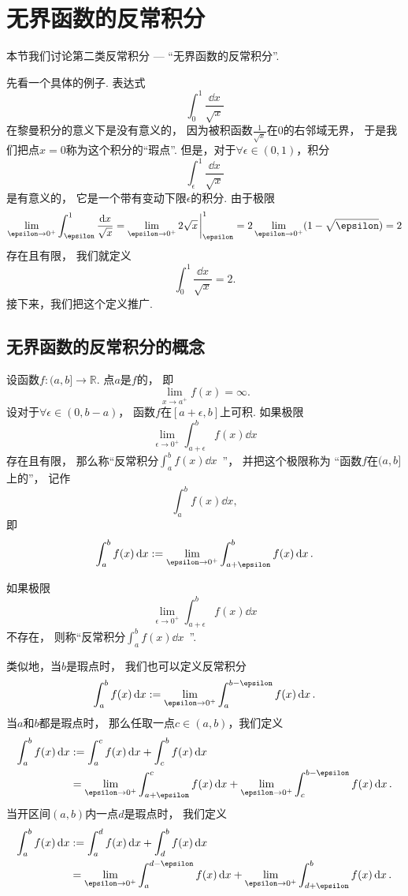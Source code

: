 \section{无界函数的反常积分}
本节我们讨论第二类反常积分 --- “无界函数的反常积分”.

先看一个具体的例子.
表达式\[
	\int_0^1 \frac{\dd{x}}{\sqrt{x}}
\]在黎曼积分的意义下是没有意义的，
因为被积函数\(\frac{1}{\sqrt{x}}\)在\(0\)的右邻域无界，
于是我们把点\(x=0\)称为这个积分的“瑕点”.
但是，对于\(\forall\epsilon\in(0,1)\)，积分\[
	\int_\epsilon^1 \frac{\dd{x}}{\sqrt{x}}
\]是有意义的，
它是一个带有变动下限\(\epsilon\)的积分.
由于极限\[
	\lim_{\epsilon\to0^+} \int_\epsilon^1 \frac{\dd{x}}{\sqrt{x}}
	= \lim_{\epsilon\to0^+} 2\sqrt{x}\eval_\epsilon^1
	= 2 \lim_{\epsilon\to0^+} (1-\sqrt\epsilon)
	= 2
\]存在且有限，
我们就定义\[
	\int_0^1 \frac{\dd{x}}{\sqrt{x}}=2.
\]
接下来，我们把这个定义推广.

\subsection{无界函数的反常积分的概念}
\begin{definition}\label{definition:定积分.无界函数的反常积分的定义1}
设函数\(f\colon(a,b]\to\mathbb{R}\).
点\(a\)是\(f\)的，
即\[
	\lim_{x \to a^+} f(x) = \infty.
\]
设对于\(\forall\epsilon\in(0,b-a)\)，
函数\(f\)在\([a+\epsilon,b]\)上可积.
如果极限\[
	\lim_{\epsilon\to0^+} \int_{a+\epsilon}^b f(x) \dd{x}
\]存在且有限，
那么称“反常积分\(\int_a^b f(x) \dd{x}\)~”，
并把这个极限称为
“函数\(f\)在\((a,b]\)上的”，
记作\[
	\int_a^b f(x) \dd{x},
\]
即\[
	\int_a^b f(x) \dd{x}
	\defeq
	\lim_{\epsilon\to0^+} \int_{a+\epsilon}^b f(x) \dd{x}.
\]

如果极限\[
	\lim_{\epsilon\to0^+} \int_{a+\epsilon}^b f(x) \dd{x}
\]不存在，
则称“反常积分\(\int_a^b f(x) \dd{x}\)~”.
\end{definition}

类似地，当\(b\)是瑕点时，
我们也可以定义反常积分\[
	\int_a^b f(x) \dd{x}
	\defeq
	\lim_{\epsilon\to0^+} \int_a^{b-\epsilon} f(x) \dd{x}.
\]
当\(a\)和\(b\)都是瑕点时，
那么任取一点\(c\in(a,b)\)，我们定义\begin{align*}
	\int_a^b f(x) \dd{x}
	&\defeq
	\int_a^c f(x) \dd{x}
	+ \int_c^b f(x) \dd{x} \\
	&= \lim_{\epsilon\to0^+} \int_{a+\epsilon}^c f(x) \dd{x}
	+ \lim_{\epsilon\to0^+} \int_c^{b-\epsilon} f(x) \dd{x}.
\end{align*}
当开区间\((a,b)\)内一点\(d\)是瑕点时，
我们定义\begin{align*}
	\int_a^b f(x) \dd{x}
	&\defeq \int_a^d f(x) \dd{x}
		+ \int_d^b f(x) \dd{x} \\
	&= \lim_{\epsilon\to0^+} \int_a^{d-\epsilon} f(x) \dd{x}
		+ \lim_{\epsilon\to0^+} \int_{d+\epsilon}^b f(x) \dd{x}.
\end{align*}

